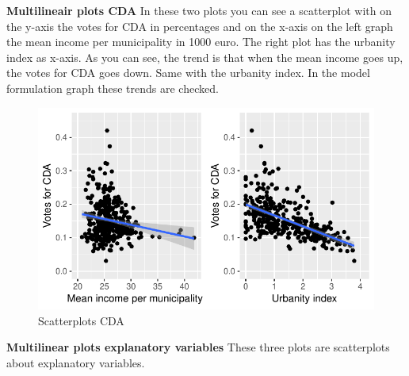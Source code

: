 \documentclass[11pt,]{article}
\begin{document}
\textbf{Multilineair plots CDA } In these two plots you can see a
scatterplot with on the y-axis the votes for CDA in percentages and on
the x-axis on the left graph the mean income per municipality in 1000
euro. The right plot has the urbanity index as x-axis. As you can see,
the trend is that when the mean income goes up, the votes for CDA goes
down. Same with the urbanity index. In the model formulation graph these
trends are checked.

\begin{figure}[H]

{\centering \includegraphics{Report_files/figure-latex/unnamed-chunk-6-1} 

}

\caption{\label{3}Scatterplots CDA}\label{fig:unnamed-chunk-6}
\end{figure}

\textbf{Multilinear plots explanatory variables} These three plots are
scatterplots about explanatory variables.
\end{document}
